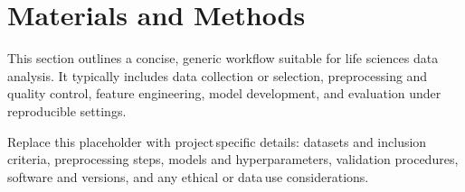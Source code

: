 \section{Materials and Methods}

\noindent This section outlines a concise, generic workflow suitable for life sciences data analysis. It typically includes data collection or selection, preprocessing and quality control, feature engineering, model development, and evaluation under reproducible settings.

\noindent Replace this placeholder with project\,specific details: datasets and inclusion criteria, preprocessing steps, models and hyperparameters, validation procedures, software and versions, and any ethical or data\,use considerations.